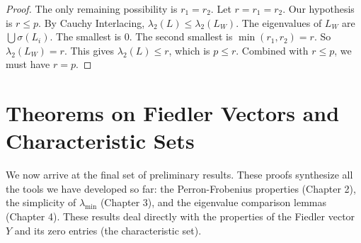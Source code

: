 \documentclass[12pt,a4paper]{report}
\theoremstyle{plain}
\theoremstyle{definition}
\theoremstyle{remark}
\begin{document}
\begin{proof}
The only remaining possibility is $r_1 = r_2$. Let $r = r_1 = r_2$. Our hypothesis is $r \le p$.
By Cauchy Interlacing, $\lambda_2(L) \le \lambda_2(L_W)$.
The eigenvalues of $L_W$ are $\bigcup \sigma(L_i)$. The smallest is 0. The second smallest is $\min(r_1, r_2) = r$.
So $\lambda_2(L_W) = r$.
This gives $\lambda_2(L) \le r$, which is $p \le r$.
Combined with $r \le p$, we must have $r = p$.
\end{proof}

\chapter{Theorems on Fiedler Vectors and Characteristic Sets}

We now arrive at the final set of preliminary results. These proofs synthesize all the tools we have developed so far: the Perron-Frobenius properties (Chapter 2), the simplicity of $\lambda_{\min}$ (Chapter 3), and the eigenvalue comparison lemmas (Chapter 4). These results deal directly with the properties of the Fiedler vector $Y$ and its zero entries (the characteristic set).
\end{document}
